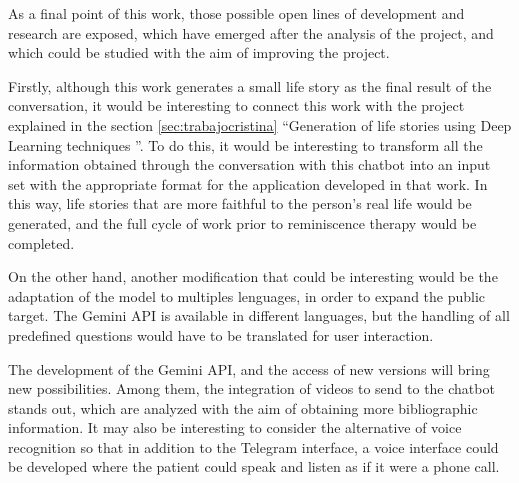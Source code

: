 As a final point of this work, those possible open lines of development and research are exposed, which have emerged after the analysis of the project, and which could be studied with the aim of improving the project.

Firstly, although this work generates a small life story as the final result of the conversation, it would be interesting to connect this work with the project explained in the section \ref{sec:trabajocristina} ``Generation of life stories using Deep Learning techniques ''. To do this, it would be interesting to transform all the information obtained through the conversation with this chatbot into an input set with the appropriate format for the application developed in that work. In this way, life stories that are more faithful to the person's real life would be generated, and the full cycle of work prior to reminiscence therapy would be completed.

On the other hand, another modification that could be interesting would be the adaptation of the model to multiples lenguages, in order to expand the public target. The Gemini API is available in different languages, but the handling of all predefined questions would have to be translated for user interaction.

The development of the Gemini API, and the access of new versions will bring new possibilities. Among them, the integration of videos to send to the chatbot stands out, which are analyzed with the aim of obtaining more bibliographic information. It may also be interesting to consider the alternative of voice recognition so that in addition to the Telegram interface, a voice interface could be developed where the patient could speak and listen as if it were a phone call.

